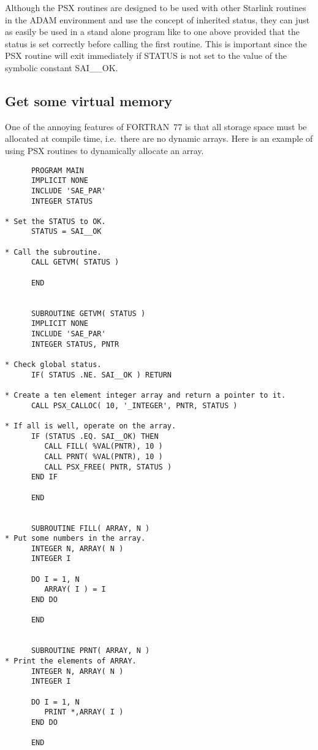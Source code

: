 Although the PSX routines are designed to be used with other Starlink routines
in the ADAM environment and use the concept of inherited status, they can just
as easily be used in a stand alone program like to one above provided that the
status is set correctly before calling the first routine. This is important
since the PSX routine will exit immediately if STATUS is not set to the value
of the symbolic constant SAI\_\_OK.

\subsection{Get some virtual memory}

One of the annoying features of FORTRAN~77 is that all storage space must be
allocated at compile time, i.e.\ there are no dynamic arrays. Here is an
example of using PSX routines to dynamically allocate an array.

\begin{small}
\begin{verbatim}
      PROGRAM MAIN
      IMPLICIT NONE
      INCLUDE 'SAE_PAR'
      INTEGER STATUS

* Set the STATUS to OK.
      STATUS = SAI__OK

* Call the subroutine.
      CALL GETVM( STATUS )

      END


      SUBROUTINE GETVM( STATUS )
      IMPLICIT NONE
      INCLUDE 'SAE_PAR'
      INTEGER STATUS, PNTR

* Check global status.
      IF( STATUS .NE. SAI__OK ) RETURN

* Create a ten element integer array and return a pointer to it.
      CALL PSX_CALLOC( 10, '_INTEGER', PNTR, STATUS )

* If all is well, operate on the array.
      IF (STATUS .EQ. SAI__OK) THEN
         CALL FILL( %VAL(PNTR), 10 )
         CALL PRNT( %VAL(PNTR), 10 )
         CALL PSX_FREE( PNTR, STATUS )
      END IF

      END


      SUBROUTINE FILL( ARRAY, N )
* Put some numbers in the array.
      INTEGER N, ARRAY( N )
      INTEGER I

      DO I = 1, N
         ARRAY( I ) = I
      END DO

      END


      SUBROUTINE PRNT( ARRAY, N )
* Print the elements of ARRAY.
      INTEGER N, ARRAY( N )
      INTEGER I

      DO I = 1, N
         PRINT *,ARRAY( I )
      END DO

      END
\end{verbatim}
\end{small}

